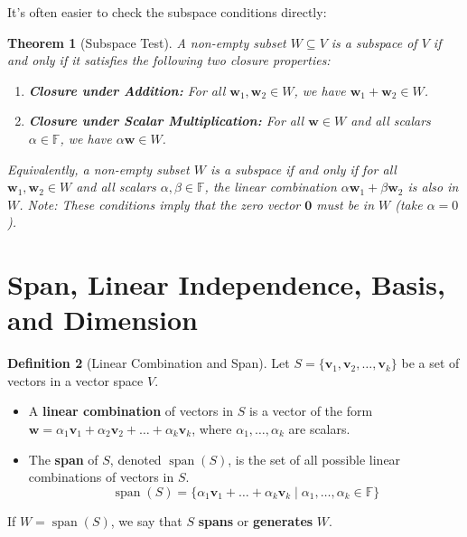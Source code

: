 \documentclass[11pt]{article}
\newtheorem{theorem}{Theorem}[section]
\theoremstyle{definition}
\newtheorem{definition}[theorem]{Definition}
\theoremstyle{remark}
\newcommand{\F}{\mathbb{F}}
\newcommand{\Span}{\operatorname{span}}
\begin{document}
It's often easier to check the subspace conditions directly:
\begin{theorem}[Subspace Test]
A non-empty subset $W \subseteq V$ is a subspace of $V$ if and only if it satisfies the following two closure properties:
\begin{enumerate}
    \item \textbf{Closure under Addition:} For all $\mathbf{w}_1, \mathbf{w}_2 \in W$, we have $\mathbf{w}_1 + \mathbf{w}_2 \in W$.
    \item \textbf{Closure under Scalar Multiplication:} For all $\mathbf{w} \in W$ and all scalars $\alpha \in \F$, we have $\alpha \mathbf{w} \in W$.
\end{enumerate}
Equivalently, a non-empty subset $W$ is a subspace if and only if for all $\mathbf{w}_1, \mathbf{w}_2 \in W$ and all scalars $\alpha, \beta \in \F$, the linear combination $\alpha \mathbf{w}_1 + \beta \mathbf{w}_2$ is also in $W$.
Note: These conditions imply that the zero vector $\mathbf{0}$ must be in $W$ (take $\alpha = 0$).
\end{theorem}

\section{Span, Linear Independence, Basis, and Dimension}

\begin{definition}[Linear Combination and Span]
Let $S = \{\mathbf{v}_1, \mathbf{v}_2, \dots, \mathbf{v}_k\}$ be a set of vectors in a vector space $V$.
\begin{itemize}
    \item A \textbf{linear combination} of vectors in $S$ is a vector of the form $\mathbf{w} = \alpha_1 \mathbf{v}_1 + \alpha_2 \mathbf{v}_2 + \dots + \alpha_k \mathbf{v}_k$, where $\alpha_1, \dots, \alpha_k$ are scalars.
    \item The \textbf{span} of $S$, denoted $\Span(S)$, is the set of all possible linear combinations of vectors in $S$.
    \[ \Span(S) = \{ \alpha_1 \mathbf{v}_1 + \dots + \alpha_k \mathbf{v}_k \mid \alpha_1, \dots, \alpha_k \in \F \} \]
\end{itemize}
If $W = \Span(S)$, we say that $S$ \textbf{spans} or \textbf{generates} $W$.
\end{definition}
\end{document}

